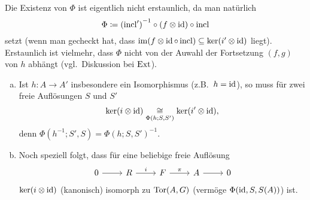 \begin{kommentar}
  Die Existenz von $\Phi$ ist eigentlich nicht erstaunlich, da man natürlich
  \begin{equation*}
    \Phi \coloneqq {(\operatorname{incl}')}^{-1} \circ (f \otimes \operatorname{id}) \circ \operatorname{incl}
  \end{equation*}
  setzt (wenn man gecheckt hat, dass $\operatorname{im}(f \otimes \operatorname{id} \circ \operatorname{incl}) \subseteq  \ker(i' \otimes \operatorname{id})$ liegt).
  Erstaunlich ist vielmehr, dass $\Phi$ nicht von der Auwahl der Fortsetzung $(f,g)$ von $h$ abhängt (vgl.\ Diskussion bei $\mathrm{Ext}$).
\end{kommentar}

\begin{kommentar}
  \begin{enumerate}[(a)]
      Die Zuordnung $(h;S,S') \mapsto \Phi(h; S, S')$ ist funktoriell in dem Sinne, dass gilt:
      \begin{enumerate}[(i)]
        \item
          $\Phi(\id,S,S) = \id$
        \item
          $\Phi(h' \circ h; S, S'') = \Phi(h'; S, S') \circ \Phi(h; S', S'')$
      \end{enumerate}
    \item
      Ist $h \colon A \to A'$ insbesondere ein Isomorphismus (z.B.\ $h = \operatorname{id}$), so muss für zwei freie Auflösungen $S$ und $S'$
      \begin{equation*}
        \ker(i \otimes \operatorname{id}) \underset{\Phi(h;S,S')}{\cong} \ker(i' \otimes \operatorname{id}),
      \end{equation*}
      denn $\Phi(h^{-1}; S', S) = {\Phi(h; S, S')}^{-1}$.
    \item
      Noch speziell folgt, dass für eine beliebige freie Auflösung
      \begin{equation*}
        \begin{tikzcd}
          0 \arrow{r}{}
          & R \arrow{r}{i}
          & F \arrow{r}{\pi}
          & A \arrow{r}{}
          & 0
        \end{tikzcd}
      \end{equation*}
      $\ker(i \otimes \operatorname{id})$ (kanonisch) isomorph zu $\mathrm{Tor}(A,G)$ (vermöge $\Phi(\operatorname{id}, S, S(A))$) ist.
  \end{enumerate}
\end{kommentar}

